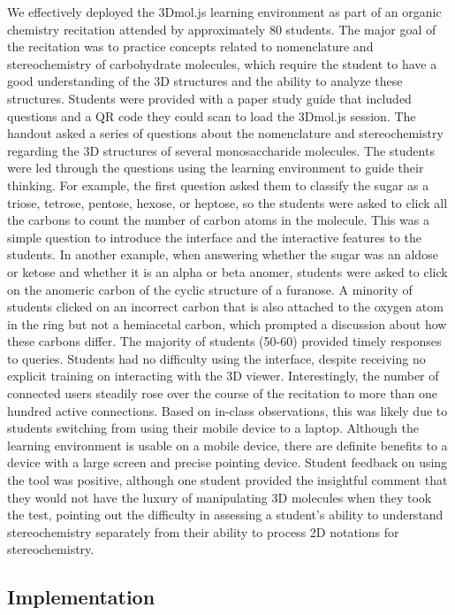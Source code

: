 \documentclass[journal=jceda8,manuscript=article]{achemso}
\begin{document}
We effectively deployed the 3Dmol.js learning environment as part of an organic chemistry recitation attended by approximately 80 students. The major goal of the recitation was to practice concepts related to nomenclature and stereochemistry of carbohydrate molecules, which require the student to have a good understanding of the 3D structures and the ability to analyze these structures.  Students were provided with a paper study guide that included questions and a QR code they could scan to load the 3Dmol.js session.  The handout asked a series of questions about the nomenclature and stereochemistry regarding the 3D structures of several monosaccharide molecules.  The students were led through the questions using the learning environment to guide their thinking.  For example, the first question asked them to classify the sugar as a triose, tetrose, pentose, hexose, or heptose, so the students were asked to click all the carbons to count the number of carbon atoms in the molecule.  This was a simple question to introduce the interface and the interactive features to the students.  In another example, when answering whether the sugar was an aldose or ketose and whether it is an alpha or beta anomer, students were asked to click on the anomeric carbon of the cyclic structure of a furanose.  A minority of students clicked on an incorrect carbon that is also attached to the oxygen atom in the ring but not a hemiacetal carbon, which prompted a discussion about how these carbons differ.  The majority of students (50-60) provided timely responses to queries.  Students had no difficulty using the interface, despite receiving no explicit training on interacting with the 3D viewer.  Interestingly, the number of connected users steadily rose over the course of the recitation to more than one hundred active connections.  Based on in-class observations, this was likely due to students switching from using their mobile device to a laptop.  Although the learning environment is usable on a mobile device, there are definite benefits to a device with a large screen and precise pointing device.  Student feedback on using the tool was positive, although one student provided the insightful comment that they would not have the luxury of manipulating 3D molecules when they took the test, pointing out the difficulty in assessing a student's ability to understand stereochemistry separately from their ability to process 2D notations for stereochemistry.



\subsection{Implementation}
\end{document}
